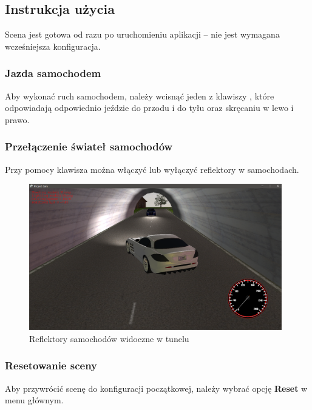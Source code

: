 \documentclass[10pt,a4paper]{article}
\begin{document}
\newpage
\subsection{Instrukcja użycia}
Scena jest gotowa od razu po uruchomieniu aplikacji -- nie jest wymagana wcześniejsza konfiguracja.

\subsubsection{Jazda samochodem}
Aby wykonać ruch samochodem, należy wcisnąć jeden z klawiszy , które odpowiadają odpowiednio jeździe do przodu i do tyłu oraz skręcaniu w lewo i prawo.

\subsubsection{Przełączenie świateł samochodów}
Przy pomocy klawisza  można włączyć lub wyłączyć reflektory w samochodach.
\begin{figure}[H]
  \centering
  \includegraphics[width=11cm]{Resources/Images/tunnel.png}
  \caption{Reflektory samochodów widoczne w tunelu}
\end{figure}

\subsubsection{Resetowanie sceny}
Aby przywrócić scenę do konfiguracji początkowej, należy wybrać opcję \textbf{Reset} w menu głównym.
\end{document}
